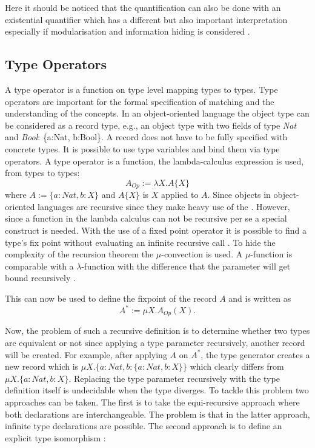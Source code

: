 Here it should be noticed that the quantification can also be done with an
existential quantifier which has a different but also important
interpretation especially if modularisation and information hiding is
considered \cite{cameron_existential_2009,pierce_types_2002}.

\subsection{Type Operators}
 A type operator is a function on type level mapping types to
types. Type operators are important for the formal specification of
matching and the understanding of the concepts. In an object-oriented
language the object type can be considered as a record type, e.g.,
an object type with two fields of type \emph{Nat} and \emph{Bool}:
\{a:Nat, b:Bool\}. A record does not have to be fully specified with
concrete types. It is possible to use type variables and bind them
via type operators. A type operator is a function, the lambda-calculus
expression is used, from types to types: \[A_{Op} := \lambda X.A\{X\}
\] where $A := \{a:Nat, b:X\}$ and $A\{X\}$ is $X$ applied to $A$. Since
objects in object-oriented languages are recursive since they make heavy
use of the \mytype. 
However, since a function in the lambda calculus
can not be recursive per se a special construct is needed. With
the use of a fixed point operator it is possible
to find a type's fix point without evaluating an infinite recursive
call \cite{gabriel_why_1988}. To hide the complexity of the recursion
theorem the $\mu$-convection 
is used. A $\mu$-function is comparable
with a $\lambda$-function with the difference that the parameter will get
bound recursively \cite{pierce_types_2002,simons_theory_2002-3}.

This can now be used to define the fixpoint of the record $A$ and is
written as \[A^* := \mu X.A_{Op}(X).\]

Now, the problem of such a recursive definition is to determine whether
two types are equivalent or not since applying a type parameter
recursively, another record will be created. For example, after
applying $A$ on $A^*$, the type generator creates a new record which
is $\mu X.\{a:Nat, b:\{a:Nat, b:X\}\}$ which clearly differs from $\mu
X.\{a:Nat, b:X\}$. Replacing the type parameter recursively with the
type definition itself is undecidable when the type diverges. 
To tackle
this problem two approaches can be taken. The first is to take the
equi-recursive approach where both declarations are interchangeable. The
problem is that in the latter approach, infinite type declarations
are possible. The second approach is to define an explicit type
isomorphism
\cite{abadi_subtyping_1996}:

